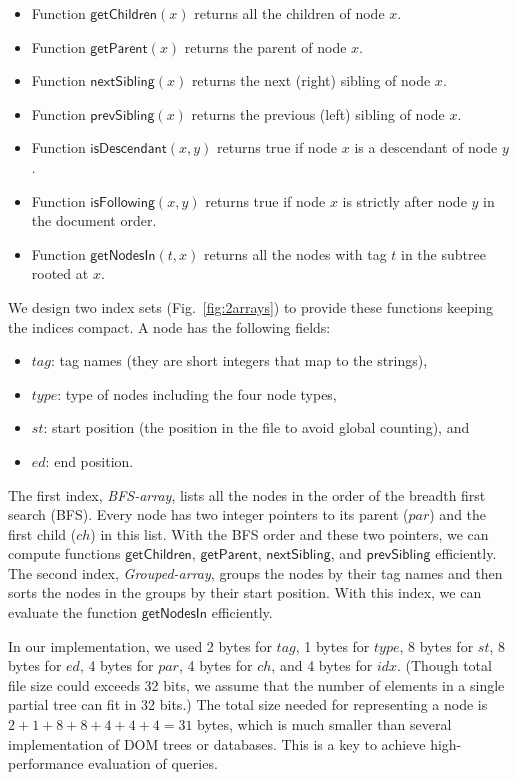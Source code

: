 \begin{itemize}
	\item Function $\mathsf{getChildren}(x)$ returns all the children of node $x$.
	\item Function $\mathsf{getParent}(x)$ returns the parent of node $x$.
	\item Function $\mathsf{nextSibling}(x)$ returns the next (right) sibling of node $x$.
	\item Function $\mathsf{prevSibling}(x)$ returns the previous (left) sibling of node $x$.
	\item Function $\mathsf{isDescendant}(x, y)$ returns true if node $x$ is a descendant of node $y$.
	\item Function $\mathsf{isFollowing}(x, y)$ returns true if node $x$ is strictly after node $y$ in the document order.
	\item Function $\mathsf{getNodesIn}(t, x)$ returns all the nodes with tag $\mathit{t}$ in the subtree rooted at $x$.
\end{itemize}

We design two index sets (Fig.~\ref{fig:2arrays}) to provide these functions
keeping the indices compact. A node has the following fields:

\begin{itemize}
	\item $\mathit{tag}$: tag names (they are short integers that map to the strings),
	\item $\mathit{type}$: type of nodes including the four node types,
	\item $\mathit{st}$: start position (the position in the file to avoid global counting), and
	\item $\mathit{ed}$: end position.
\end{itemize}

The first index, \emph{BFS-array}, lists all the nodes in the order of the
breadth first search (BFS). Every node has two integer pointers to its parent
($par$) and the first child ($ch$) in this list. With the BFS order and these
two pointers, we can compute functions $\mathsf{getChildren}$,
$\mathsf{getParent}$, $\mathsf{nextSibling}$, and $\mathsf{prevSibling}$
efficiently. The second index, \emph{Grouped-array}, groups the nodes by their
tag names and then sorts the nodes in the groups by their start position.  With
this index, we can evaluate the function $\mathsf{getNodesIn}$ efficiently.

In our implementation, we used
2 bytes for $\mathit{tag}$,
1 bytes for $\mathit{type}$,
8 bytes for $\mathit{st}$,
8 bytes for $\mathit{ed}$,
4 bytes for $\mathit{par}$,
4 bytes for $\mathit{ch}$, and
4 bytes for $\mathit{idx}$.
(Though total file size could exceeds 32 bits, we assume that the number of
elements in a single partial tree can fit in 32 bits.) The total size needed for
representing a node is $2 + 1 + 8 + 8 + 4 + 4 + 4 = 31$ bytes, which is much
smaller than several implementation of DOM trees or databases. This is a key to
achieve high-performance evaluation of queries.

